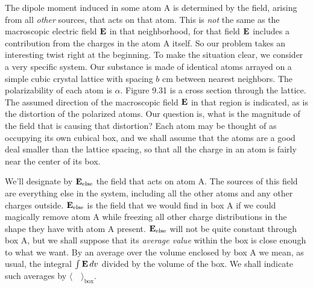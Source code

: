 The dipole moment induced in some atom A is determined by the
field, arising from all \emph{other} sources, that acts on that atom. This is
\emph{not} the same as the macroscopic electric field $\mathbf{E}$ in that neighborhood,
for that field $\mathbf{E}$ includes a contribution from the charges in the atom A
itself. So our problem takes an interesting twist right at the 
beginning. To make the situation clear, we consider a very specific system.
Our substance is made of identical atoms arrayed on a simple cubic
crystal lattice with spacing $b$ cm between nearest neighbors. The
polarizability of each atom is $\alpha$. Figure 9.31 is a cross section
through the lattice. The assumed direction of the macroscopic field
$\mathbf{E}$ in that region is indicated, as is the distortion of the polarized
atoms. Our question is, what is the magnitude of the field that is
causing that distortion? Each atom may be thought of as occupying
its own cubical box, and we shall assume that the atoms are a good
deal smaller than the lattice spacing, so that all the charge in an atom
is fairly near the center of its box.

We'll designate by $\mathbf{E}_\text{else}$ the field that acts on atom A. The sources
of this field are everything else in the system, including all the other
atoms and any other charges outside. $\mathbf{E}_\text{else}$ is the field that we would
find in box A if we could magically remove atom A while freezing all
other charge distributions in the shape they have with atom A
present. $\mathbf{E}_\text{else}$ will not be quite constant through box A, but we shall
suppose that its \emph{average value} within the box is close enough to what
we want. By an average over the volume enclosed by box A we
mean, as usual, the integral $\int\mathbf{E}\mathop{d\!} v$ divided by the volume of the box.
We shall indicate such averages by $\langle\quad\rangle_\text{box}$.

